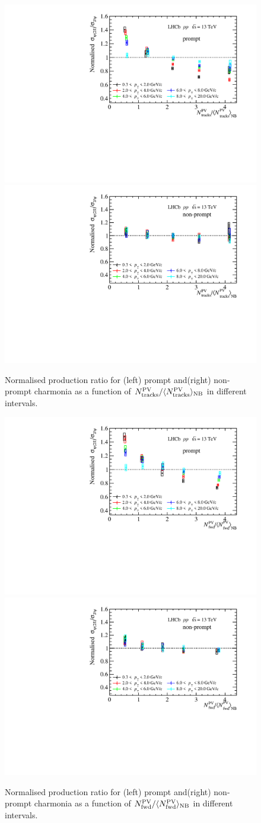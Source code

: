 \documentclass[12pt,a4paper]{article}
\begin{document}
\begin{figure}[H]
  \begin{center}

	  \includegraphics[width=0.48\linewidth]{pdf/Result/promptRatioPT.pdf}
          \includegraphics[width=0.48\linewidth]{pdf/Result/frombRatioPT.pdf}
	  \vspace*{-0.5cm}
  \end{center}
	\caption{Normalised production ratio for (left) prompt and(right) non-prompt charmonia as a function of $N_{\rm tracks}^{\rm PV}/\langle N_{\rm tracks}^{\rm PV}\rangle_{\rm{NB}}$ in different \pt intervals.}
  \label{RatioPT_PVN}
\end{figure}
\begin{figure}[H]
  \begin{center}
	  \vspace*{-0.5cm}
    \includegraphics[width=0.48\linewidth]{pdf/Result/promptRatioPTF.pdf}
    \includegraphics[width=0.48\linewidth]{pdf/Result/frombRatioPTF.pdf}
	  \vspace*{-0.5cm}
  \end{center}
	\caption{Normalised production ratio for (left) prompt and(right) non-prompt charmonia as a function of $N_{\rm fwd}^{\rm PV}/\langle N_{\rm fwd}^{\rm PV}\rangle_{\rm{NB}}$ in different \pt intervals.}
  \label{RatioPT_For}
\end{figure}
\end{document}
